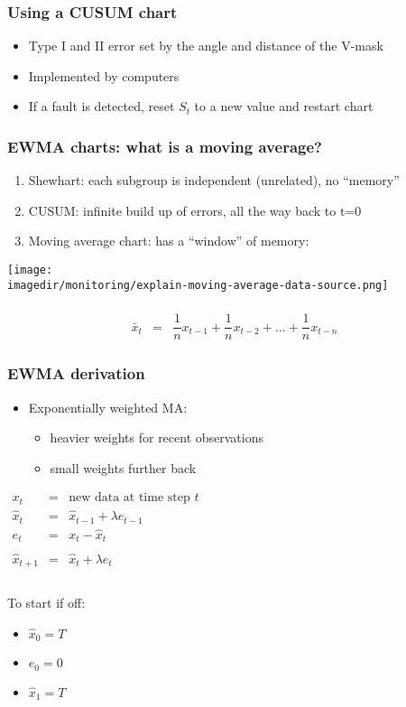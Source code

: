 \begin{frame}\frametitle{Using a CUSUM chart}
	\begin{itemize}
		\item	Type I and II error set by the angle and distance of the V-mask
		\item	Implemented by computers
		\item	If a fault is detected, reset $S_t$ to a new value and restart chart
	\end{itemize}
\end{frame}

\begin{frame}\frametitle{EWMA charts: what is a moving average?}
	\begin{enumerate}
		\item	Shewhart: each subgroup is independent (unrelated), no ``memory''
		\item	CUSUM: infinite build up of errors, all the way back to t=0
		\item	Moving average chart: has a ``window'' of memory:
	\end{enumerate}
	
	\begin{center}
		\texttt{[image: \\imagedir/monitoring/explain-moving-average-data-source.png]}
	\end{center}
	
	$$
	\begin{array}{rcl}
		\\
		\bar{x}_t &=& \dfrac{1}{n}x_{t-1} + \dfrac{1}{n}x_{t-2} + \ldots + \dfrac{1}{n}x_{t-n}
	\end{array}
	$$
\end{frame}

\begin{frame}\frametitle{EWMA derivation}
	\begin{itemize}
		\item	Exponentially weighted MA:
		\begin{itemize}
			\item	heavier weights for recent observations
			\item	small weights further back
		\end{itemize}
	\end{itemize}

	$
	\begin{array}{rcl}
		x_t &=& \text{new data at time step } t\\
		\hat{x}_t &=& \hat{x}_{t-1} + \lambda e_{t-1} \\
		e_t &=& x_t - \hat{x}_t \\
		\\
		\hat{x}_{t+1} &=& \hat{x}_{t} + \lambda e_{t} \\
		\\
	\end{array}
	$

	To start if off:
	\begin{itemize}
		\item	$\hat{x}_0 = T$
		\item	$e_0 = 0$
		\item	$\hat{x}_1 = T$
	\end{itemize}
\end{frame}

